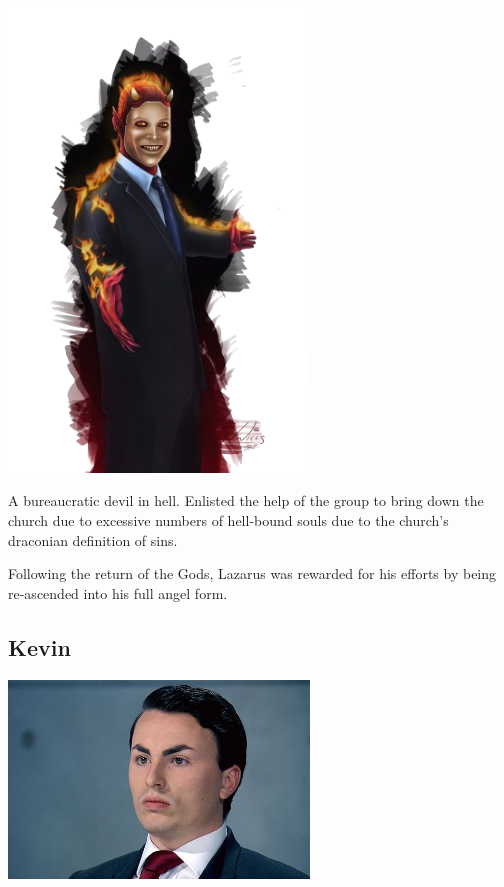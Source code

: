 \begin{center}
\includegraphics[width=80mm]{./content/img/lazarus.png}
\begin{figure}[h]
\end{figure}
\end{center}

\noindent 

A bureaucratic devil in hell. Enlisted the help of the group to bring down the church due to excessive numbers of hell-bound souls due to the church's draconian definition of sins.



Following the return of the Gods, Lazarus was rewarded for his efforts by being re-ascended into his full angel form.    

\smallskip

\subsection*{Kevin} 

\begin{center}
\includegraphics[width=80mm]{./content/img/kevin.jpg}
\begin{figure}[h]
\end{figure}
\end{center}

